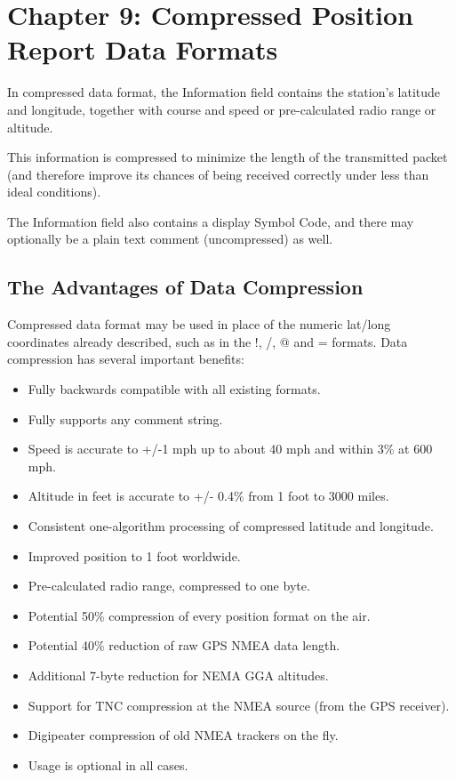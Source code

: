 
\chapter{Chapter 9: Compressed Position Report Data Formats}


In compressed data format, the Information field contains the
station’s latitude and longitude, together with course and speed or
pre-calculated radio range or altitude.

This information is compressed to minimize the length of the
transmitted packet (and therefore improve its chances of being
received correctly under less than ideal conditions).

The Information field also contains a display Symbol Code, and there
may optionally be a plain text comment (uncompressed) as well.

\section {The Advantages of Data Compression}

Compressed data format may be used in place of the numeric lat/long
coordinates already described, such as in the !, /, @ and = formats.
Data compression has several important benefits:

\begin{itemize}
  
\item Fully backwards compatible with all existing formats.
\item Fully supports any comment string.
\item Speed is accurate to +/-1 mph up to about 40 mph and within 3\%
  at 600 mph.
\item Altitude in feet is accurate to +/- 0.4\% from 1 foot to 3000 miles.
\item Consistent one-algorithm processing of compressed latitude and
  longitude.

\item Improved position to 1 foot worldwide.
\item Pre-calculated radio range, compressed to one byte.
\item Potential 50\% compression of every position format on the air.
\item Potential 40\% reduction of raw GPS NMEA data length.
\item Additional 7-byte reduction for NEMA GGA altitudes.
\item Support for TNC compression at the NMEA source (from the GPS
  receiver).

\item Digipeater compression of old NMEA trackers on the fly.
\item Usage is optional in all cases.

\end{itemize}

